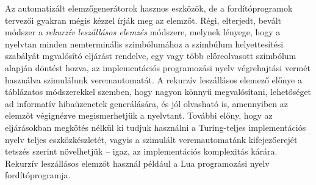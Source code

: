 Az automatizált elemzőgenerátorok hasznos eszközök, de a fordítóprogramok tervezői gyakran mégis kézzel írják meg az elemzőt.
Régi, elterjedt, bevált módszer a \textit{rekurzív leszállásos elemzés} módszere, melynek lényege, hogy a nyelvtan minden nemterminális szimbólumához a szimbúlum helyettesítési szabályát mgvalósító eljárást rendelve, egy vagy több előreolvasott szimbólum alapján döntést hozva, az implementációs programozási nyelv végrehajtási vermét használva szimulálunk veremautomatát.
A rekurzív leszállásos elemező előnye a táblázatos módszerekkel szemben, hogy nagyon könnyű megvalósítani, lehetőséget ad informatív hibaüzenetek generálására, és jól olvasható is, amennyiben az elemzőt végignézve megismerhetjük a nyelvtant.
További előny, hogy az eljárásokban megkötés nélkül ki tudjuk használni a Turing-teljes implementációs nyelv teljes eszközkészletét, vagyis a szimulált veremautomatánk kifejezőerejét tetszés szerint növelhetjük -- igaz, az implementációs komplexitás kárára.
Rekurzív leszállásos elemzőt használ például a Lua programozási nyelv fordítóprogramja.





